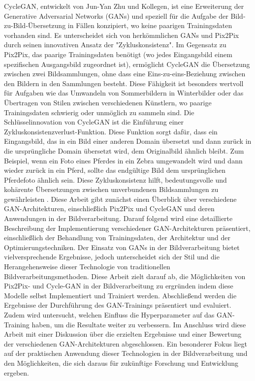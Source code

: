 \newline
CycleGAN, entwickelt von Jun-Yan Zhu und Kollegen, ist eine Erweiterung der Generative Adversarial Networks (GANs) und speziell für die Aufgabe der Bild-zu-Bild-Übersetzung in Fällen konzipiert, wo keine paarigen Trainingsdaten vorhanden sind. Es unterscheidet sich von herkömmlichen GANs und Pix2Pix durch seinen innovativen Ansatz der "Zykluskonsistenz".
Im Gegensatz zu Pix2Pix, das paarige Trainingsdaten benötigt (wo jedes Eingangsbild einem spezifischen Ausgangsbild zugeordnet ist), ermöglicht CycleGAN die Übersetzung zwischen zwei Bildsammlungen, ohne dass eine Eins-zu-eins-Beziehung zwischen den Bildern in den Sammlungen besteht. Diese Fähigkeit ist besonders wertvoll für Aufgaben wie das Umwandeln von Sommerbildern in Winterbilder oder das Übertragen von Stilen zwischen verschiedenen Künstlern, wo paarige Trainingsdaten schwierig oder unmöglich zu sammeln sind.
Die Schlüsselinnovation von CycleGAN ist die Einführung einer Zykluskonsistenzverlust-Funktion. Diese Funktion sorgt dafür, dass ein Eingangsbild, das in ein Bild einer anderen Domain übersetzt und dann zurück in die ursprüngliche Domain übersetzt wird, dem Originalbild ähnlich bleibt. Zum Beispiel, wenn ein Foto eines Pferdes in ein Zebra umgewandelt wird und dann wieder zurück in ein Pferd, sollte das endgültige Bild dem ursprünglichen Pferdefoto ähnlich sein. Diese Zykluskonsistenz hilft, bedeutungsvolle und kohärente Übersetzungen zwischen unverbundenen Bildsammlungen zu gewährleisten \cite{Zhu.2017}.\newline
Diese Arbeit gibt zunächst einen Überblick über verschiedene GAN-Architekturen, einschließlich Pix2Pix und CycleGAN und deren Anwendungen in der Bildverarbeitung. Darauf folgend wird eine detaillierte Beschreibung der Implementierung verschiedener GAN-Architekturen präsentiert, einschließlich der Behandlung von Trainingsdaten, der Architektur und der Optimierungstechniken. \newline
Der Einsatz von GANs in der Bildverarbeitung bietet vielversprechende Ergebnisse, jedoch unterscheidet sich der Stil und die Herangehensweise dieser Technologie von traditionellen Bildverarbeitungsmethoden. Diese Arbeit zielt darauf ab, die Möglichkeiten von Pix2Pix- und Cycle-GAN in der Bildverarbeitung zu ergründen indem diese Modelle selbst Implementiert und Trainiert werden. \newline
Abschließend werden die Ergebnisse der Durchführung des GAN-Trainings präsentiert und evaluiert. Zudem wird untersucht, welchen Einfluss die Hyperparameter auf das GAN-Training haben, um die Resultate weiter zu verbessern. \newline 
Im Anschluss wird diese Arbeit mit einer Diskussion über die erzielten Ergebnisse und einer Bewertung der verschiedenen GAN-Architekturen abgeschlossen. Ein besonderer Fokus liegt auf der praktischen Anwendung dieser Technologien in der Bildverarbeitung und den Möglichkeiten, die sich daraus für zukünftige Forschung und Entwicklung ergeben. \newline 
